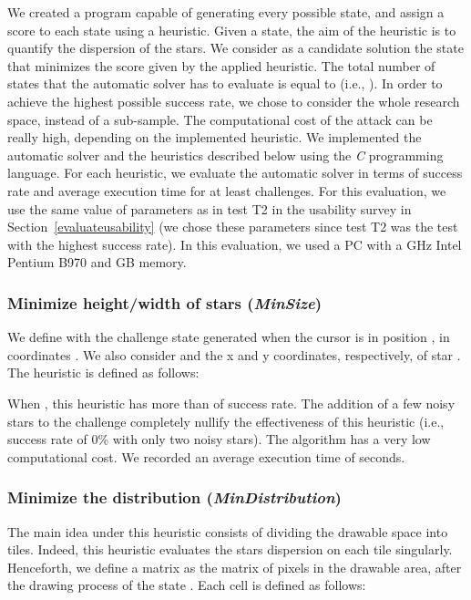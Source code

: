 \documentclass[conference]{IEEEtran}
\newcommand{\hilight}[1]{#1}
\begin{document}
We created a program capable of generating every possible state, and assign a score to each state using a heuristic.
Given a state, the aim of the heuristic is to quantify the dispersion of the stars.
We consider as a candidate solution the state that minimizes the score given by the applied heuristic. The total number of states that the automatic solver has to evaluate is equal to  (i.e., ).
\hilight{In order to achieve the highest possible success rate, we chose to consider the whole research space, instead of a sub-sample.}
The computational cost of the attack can be really high, depending on the implemented heuristic.
We implemented the automatic solver and the heuristics described below using the \textit{C} programming language.
For each heuristic, we evaluate the automatic solver in terms of success rate and average execution time for at least  challenges.
For this evaluation, we use the same value of parameters as in test T2 in the usability survey in Section~\ref{evaluateusability} 
(we chose these parameters since test T2 was the test with the highest success rate). 
In this evaluation, we used a PC with a  GHz Intel Pentium B970 and  GB memory.

\subsubsection{Minimize height/width of stars (\textit{MinSize})}
We define with  the challenge state generated when the cursor is in position , in coordinates .
We also consider  and  the x and y coordinates, respectively, of star .
The heuristic is defined as follows: 



When , this heuristic has more than  of success rate.
The addition of a few noisy stars to the challenge completely nullify the effectiveness of this heuristic (i.e., success rate of 0\% with only two noisy stars). The algorithm has a very low computational cost.
We recorded an average execution time of  seconds.


\subsubsection{Minimize the distribution (\textit{MinDistribution})}
The main idea under this heuristic consists of dividing the drawable space into tiles.
Indeed, this heuristic evaluates the stars dispersion on each tile singularly. Henceforth, we define a matrix  as the matrix of pixels in the drawable area, after the drawing process of the state .
Each cell is defined as follows:
\end{document}
